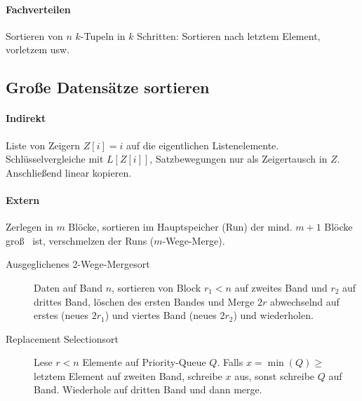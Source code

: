 \paragraph{Fachverteilen}
Sortieren von $n$ $k$-Tupeln in $k$ Schritten: Sortieren nach letztem Element, vorletzem usw.

\subsection{Gro\ss e Datensätze sortieren}

\paragraph{Indirekt}
Liste von Zeigern $Z[i] = i$ auf die eigentlichen Listenelemente. Schlüsselvergleiche mit $L[Z[i]]$, Satzbewegungen nur als Zeigertausch in $Z$. Anschlie\ss end linear kopieren.

\paragraph{Extern}
Zerlegen in $m$ Blöcke, sortieren im Hauptspeicher (Run) der mind. $m + 1$ Blöcke gro\ss~ ist, verschmelzen der Runs ($m$-Wege-Merge).

\begin{description}
  \item [Ausgeglichenes 2-Wege-Mergesort]
        Daten auf Band $n$, sortieren von Block $r_1 < n$ auf zweites Band und $r_2$ auf drittes Band, löschen des ersten Bandes und Merge $2r$ abwechselnd auf erstes (neues $2r_1$) und viertes Band (neues $2r_2$) und wiederholen.

  \item [Replacement Selectionsort]
        Lese $r < n$ Elemente auf Priority-Queue $Q$. Falls $x = \min(Q) \geq$ letztem Element auf zweiten Band, schreibe $x$ aus, sonst schreibe $Q$ auf Band. Wiederhole auf dritten Band und dann merge.
\end{description}

\mzBreak\


